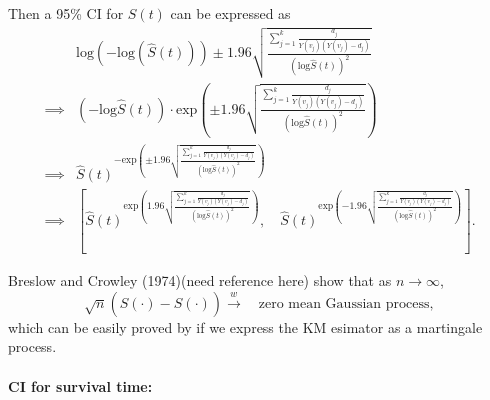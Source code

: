 \documentclass[a4paper,12pt]{article}
\begin{document}
Then a 95\% CI for $S\left(t\right)$ can be expressed as
\[
  \begin{aligned}
    & \mathrm{log}\left(-\mathrm{log}\left(\hat{S}\left(t\right)\right)\right)
    \pm 1.96\sqrt{
      \frac{
        \sum\limits_{j = 1}^k
        \frac{d_j}{Y\left(v_j\right)\left(Y\left(v_j\right) - d_j\right)}
      }{
        \left(
          \mathrm{log}\hat{S}\left(t\right)
        \right)^2
      }
    }    \\
    \implies &
    \left(-\mathrm{log}\hat{S}\left(t\right)\right)
    \cdot
    \mathrm{exp}\left(
      \pm 1.96\sqrt{
        \frac{
          \sum\limits_{j = 1}^k
          \frac{d_j}{Y\left(v_j\right)\left(Y\left(v_j\right) - d_j\right)}
        }{
          \left(
            \mathrm{log}\hat{S}\left(t\right)
          \right)^2
        }
      }
    \right)    \\
    \implies &
    \hat{S}\left(t\right)^{
      - \mathrm{exp}\left(
        \pm 1.96\sqrt{
          \frac{
            \sum\limits_{j = 1}^k
            \frac{d_j}{Y\left(v_j\right)\left(Y\left(v_j\right) - d_j\right)}
          }{
            \left(
              \mathrm{log}\hat{S}\left(t\right)
            \right)^2
          }
        }
      \right)    
    }    \\
    \implies & \left[
      \hat{S}\left(t\right)^{
        \mathrm{exp}\left(
          1.96\sqrt{
            \frac{
              \sum\limits_{j = 1}^k
              \frac{d_j}{Y\left(v_j\right)\left(Y\left(v_j\right) - d_j\right)}
            }{
              \left(
                \mathrm{log}\hat{S}\left(t\right)
              \right)^2
            }
          }
        \right) 
      }
      ,\quad
      \hat{S}\left(t\right)^{
        \mathrm{exp}\left(
          -1.96\sqrt{
            \frac{
              \sum\limits_{j = 1}^k
              \frac{d_j}{Y\left(v_j\right)\left(Y\left(v_j\right) - d_j\right)}
            }{
              \left(
                \mathrm{log}\hat{S}\left(t\right)
              \right)^2
            }
          }
        \right) 
      }
    \right]
    .
  \end{aligned}
\]
\par
{\color{red}Breslow and Crowley (1974)}{\color{blue}(need reference here)} show that as $n\to\infty$,
\[
  \sqrt{n}\left(
    \hat{S}\left(\cdot\right) - S\left(\cdot\right)
  \right)
  \overset{w}{\to}\quad
  \text{zero mean Gaussian process}
  ,
\]
which can be easily proved by if we express the KM esimator as a martingale process.

\paragraph{CI for survival time: }
\end{document}
